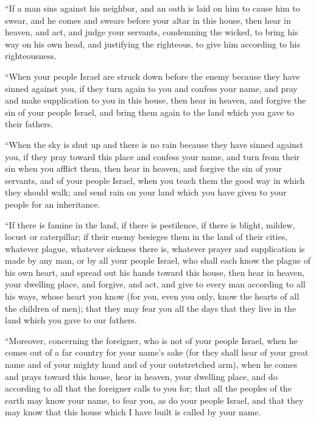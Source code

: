 \myverse{}“If a man sins against his neighbor, and an oath is laid on him
to cause him to swear, and he comes and swears before your altar in this house,
\myverse{}then hear in heaven, and act, and judge your servants, condemning the wicked,
to bring his way on his own head, and justifying the righteous, to give him according to his righteousness.

\myverse{}“When your people Israel are struck down before the enemy because
they have sinned against you, if they turn again to you and confess your name, and pray and make supplication
to you in this house,
\myverse{}then hear in heaven, and forgive the sin of your people Israel, and bring
them again to the land which you gave to their fathers.

\myverse{}“When the sky is shut up and there is no rain because they have
sinned against you, if they pray toward this place and confess your name, and turn from their sin when
you afflict them,
\myverse{}then hear in heaven, and forgive the sin of your servants, and of your people
Israel, when you teach them the good way in which they should walk; and send rain on your land which you
have given to your people for an inheritance.

\myverse{}“If there is famine in the land, if there is pestilence, if there
is blight, mildew, locust or caterpillar; if their enemy besieges them in the land of their cities, whatever
plague, whatever sickness there is,
\myverse{}whatever prayer and supplication is made by any man, or by all your people
Israel, who shall each know the plague of his own heart, and spread out his hands toward this house,
\myverse{}then hear in heaven, your dwelling place, and forgive, and act, and give to
every man according to all his ways, whose heart you know (for you, even you only, know the hearts of
all the children of men);
\myverse{}that they may fear you all the days that they live in the land which you gave
to our fathers.

\myverse{}“Moreover, concerning the foreigner, who is not of your people
Israel, when he comes out of a far country for your name’s sake
\myverse{}(for they shall hear of your great name and of your mighty hand and of your
outstretched arm), when he comes and prays toward this house,
\myverse{}hear in heaven, your dwelling place, and do according to all that the foreigner
calls to you for; that all the peoples of the earth may know your name, to fear you, as do your people
Israel, and that they may know that this house which I have built is called by your name.

